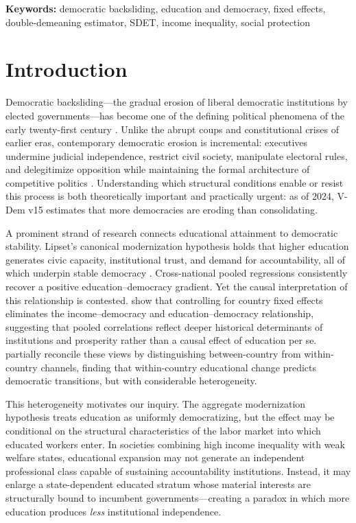 \documentclass[11pt,letterpaper]{article}
\begin{document}
\vspace{0.5em}
\noindent\textbf{Keywords:} democratic backsliding, education and democracy, fixed effects, double-demeaning estimator, SDET, income inequality, social protection

\tableofcontents
\newpage

\section{Introduction}

Democratic backsliding---the gradual erosion of liberal democratic institutions by elected
governments---has become one of the defining political phenomena of the early twenty-first century
\citep{Huntington1991}. Unlike the abrupt coups and constitutional crises of earlier eras,
contemporary democratic erosion is incremental: executives undermine judicial independence,
restrict civil society, manipulate electoral rules, and delegitimize opposition while maintaining
the formal architecture of competitive politics \citep{Carothers2002}. Understanding which
structural conditions enable or resist this process is both theoretically important and practically
urgent: as of 2024, V-Dem v15 estimates that more democracies are eroding than consolidating.

A prominent strand of research connects educational attainment to democratic stability. Lipset's
canonical modernization hypothesis holds that higher education generates civic capacity,
institutional trust, and demand for accountability, all of which underpin stable democracy
\citep{Lipset1959}. Cross-national pooled regressions consistently recover a positive
education--democracy gradient. Yet the causal interpretation of this relationship is contested.
\citet{Acemoglu2008} show that controlling for country fixed effects eliminates the
income--democracy and education--democracy relationship, suggesting that pooled correlations
reflect deeper historical determinants of institutions and prosperity rather than a causal effect
of education per se. \citet{Murtin2014} partially reconcile these views by distinguishing
between-country from within-country channels, finding that within-country educational change
predicts democratic transitions, but with considerable heterogeneity.

This heterogeneity motivates our inquiry. The aggregate modernization hypothesis treats education
as uniformly democratizing, but the effect may be conditional on the structural characteristics of
the labor market into which educated workers enter. In societies combining high income inequality
with weak welfare states, educational expansion may not generate an independent professional class
capable of sustaining accountability institutions. Instead, it may enlarge a state-dependent
educated stratum whose material interests are structurally bound to incumbent governments---creating
a paradox in which more education produces \emph{less} institutional independence.
\end{document}

